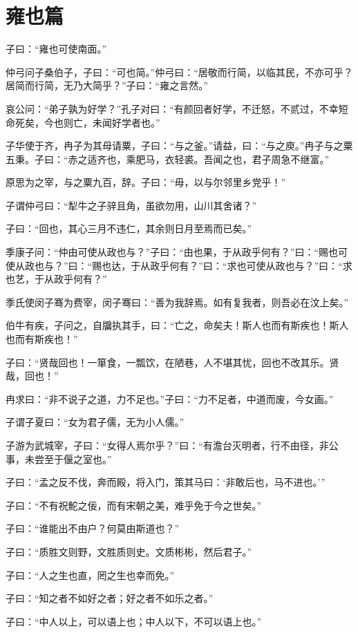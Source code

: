 \documentclass[12pt,a4paper]{ctexbook}
\begin{document}
\section{雍也篇}
子曰：“雍也可使南面。”\par
仲弓问子桑伯子，子曰：“可也简。”仲弓曰：“居敬而行简，以临其民，不亦可乎？居简而行简，无乃大简乎？”子曰：“雍之言然。”\par
哀公问：“弟子孰为好学？”孔子对曰：“有颜回者好学，不迁怒，不贰过，不幸短命死矣，今也则亡，未闻好学者也。”\par
子华使于齐，冉子为其母请粟，子曰：“与之釜。”请益，曰：“与之庾。”冉子与之粟五秉。子曰：“赤之适齐也，乘肥马，衣轻裘。吾闻之也，君子周急不继富。”\par
原思为之宰，与之粟九百，辞。子曰：“毋，以与尔邻里乡党乎！”\par
子谓仲弓曰：“犁牛之子骍且角，虽欲勿用，山川其舍诸？”\par
子曰：“回也，其心三月不违仁，其余则日月至焉而已矣。”\par
季康子问：“仲由可使从政也与？”子曰：“由也果，于从政乎何有？”曰：“赐也可使从政也与？”曰：“赐也达，于从政乎何有？”曰：“求也可使从政也与？”曰：“求也艺，于从政乎何有？”\par
季氏使闵子骞为费宰，闵子骞曰：“善为我辞焉。如有复我者，则吾必在汶上矣。”\par
伯牛有疾，子问之，自牖执其手，曰：“亡之，命矣夫！斯人也而有斯疾也！斯人也而有斯疾也！”\par
子曰：“贤哉回也！一箪食，一瓢饮，在陋巷，人不堪其忧，回也不改其乐。贤哉，回也！”\par
冉求曰：“非不说子之道，力不足也。”子曰：“力不足者，中道而废，今女画。”\par
子谓子夏曰：“女为君子儒，无为小人儒。”\par
子游为武城宰，子曰：“女得人焉尔乎？”曰：“有澹台灭明者，行不由径，非公事，未尝至于偃之室也。”\par
子曰：“孟之反不伐，奔而殿，将入门，策其马曰：‘非敢后也，马不进也。’”\par
子曰：“不有祝鮀之佞，而有宋朝之美，难乎免于今之世矣。”\par
子曰：“谁能出不由户？何莫由斯道也？”\par
子曰：“质胜文则野，文胜质则史。文质彬彬，然后君子。”\par
子曰：“人之生也直，罔之生也幸而免。”\par
子曰：“知之者不如好之者；好之者不如乐之者。”\par
子曰：“中人以上，可以语上也；中人以下，不可以语上也。”\par
\end{document}
